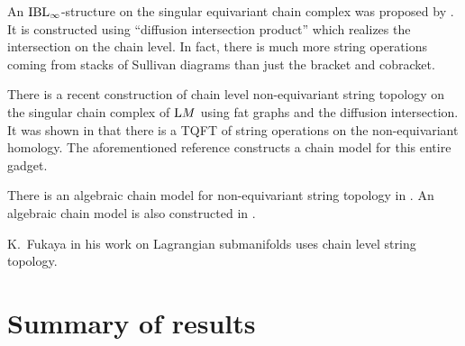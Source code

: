 \documentclass[\MainFolder/Text.tex]{subfiles}
\begin{document}
An $\mathrm{IBL}_\infty$-structure on the singular equivariant chain complex was proposed by \cite{Sullivan2005}. It is constructed using ``diffusion intersection product'' which realizes the intersection on the chain level. In fact, there is much more string operations coming from stacks of Sullivan diagrams than just the bracket and cobracket.

There is a recent construction of chain level non-equivariant string topology on the singular chain complex of $\mathrm{L} M$ using fat graphs \cite{Drummond-Cole2015} and the diffusion intersection. It was shown in \cite{Cohen2006} that there is a TQFT of string operations on the non-equivariant homology. The aforementioned reference constructs a chain model for this entire gadget. 

There is an algebraic chain model for non-equivariant string topology in \cite{Chen2012}. An algebraic chain model is also constructed in \cite{Irie2014}. 

K.~Fukaya in his work on Lagrangian submanifolds uses chain level string topology.

%
%

\section{Summary of results}
\end{document}
